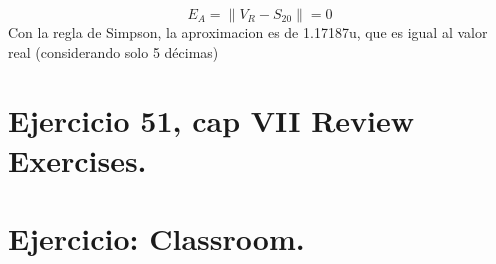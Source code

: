 \documentclass[11pt,letterpaper]{article}
\begin{document}
\begin{equation*}
    E_A=\|V_R-S_{20} \|=0
\end{equation*}
Con la regla de Simpson, la aproximacion es de 1.17187u, que es igual al valor real (considerando solo 5 décimas)

\section{Ejercicio 51, cap VII Review Exercises.}


\section{Ejercicio: Classroom.}
\end{document}
